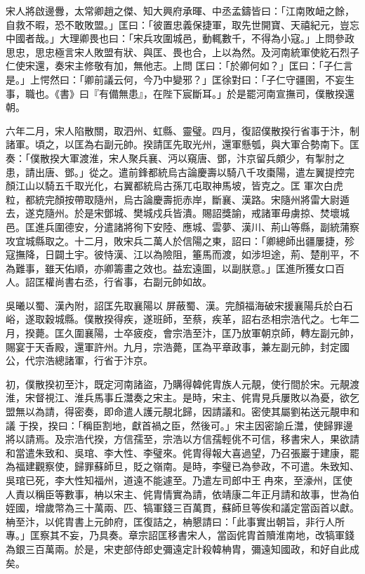 \begin{pinyinscope}
 宋人將啟邊釁，太常卿趙之傑、知大興府承暉、中丞孟鑄皆曰：「江南敗衄之餘，自救不暇，恐不敢敗盟。」匡曰：「彼置忠義保捷軍，取先世開寶、天禧紀元，豈忘中國者哉。」大理卿畏也曰：「宋兵攻圍城邑，動輒數千，不得為小寇。」上問參政思忠，思忠極言宋人敗盟有狀、與匡、畏也合，上以為然。及河南統軍使紇石烈子仁使宋還，奏宋主修敬有加，無他志。上問
 匡曰：「於卿何如？」匡曰：「子仁言是。」上愕然曰：「卿前議云何，今乃中變邪？」匡徐對曰：「子仁守疆圉，不妄生事，職也。《書》曰『有備無患』，在陛下宸斷耳。」於是罷河南宣撫司，僕散揆還朝。



 六年二月，宋人陷散關，取泗州、虹縣、靈璧。四月，復詔僕散揆行省事于汴，制諸軍。頃之，以匡為右副元帥。揆請匡先取光州，還軍懸瓠，與大軍合勢南下。匡奏：「僕散揆大軍渡淮，宋人聚兵襄、沔以窺唐、鄧，汴京留兵頗少，有掣肘之患，請出唐、鄧。」從之。遣前鋒都統烏古論慶壽以騎八千攻棗陽，遣左翼提控完顏江山以騎五千取光化，右翼都統烏古孫兀屯取神馬坡，皆克之。匡
 軍次白虎粒，都統完顏按帶取隨州，烏古論慶壽扼赤岸，斷襄、漢路。宋隨州將雷大尉遁去，遂克隨州。於是宋鄧城、樊城戍兵皆潰。賜詔獎諭，戒諸軍毋虜掠、焚壞城邑。匡進兵圍德安，分遣諸將徇下安陸、應城、雲夢、漢川、荊山等縣，副統蒲察攻宜城縣取之。十二月，敗宋兵二萬人於信陽之東，詔曰：「卿總師出疆屢捷，殄寇撫降，日闢土宇。彼恃漢、江以為險阻，箠馬而渡，如涉坦途，荊、楚削平，不為難事，雖天佑順，亦卿籌畫之效也。益宏遠圖，以副朕意。」匡進所獲女口百人。詔匡權尚書右丞，行省事，右副元帥如故。



 吳曦以蜀、漢內附，詔匡先取襄陽以
 屏蔽蜀、漢。完顏福海破宋援襄陽兵於白石峪，遂取穀城縣。僕散揆得疾，遂班師，至蔡，疾革，詔右丞相宗浩代之。七年二月，揆薨。匡久圍襄陽，士卒疲疫，會宗浩至汴，匡乃放軍朝京師，轉左副元帥，賜宴于天香殿，還軍許州。九月，宗浩薨，匡為平章政事，兼左副元帥，封定國公，代宗浩總諸軍，行省于汴京。



 初，僕散揆初至汴，既定河南諸盜，乃購得韓侂胄族人元靚，使行間於宋。元靚渡淮，宋督視江、淮兵馬事丘灊奏之宋主。是時，宋主、侂胄見兵屢敗以為憂，欲乞盟無以為請，得密奏，即命遣人護元靚北歸，因請議和。密使其屬劉祐送元靚申和議
 于揆，揆曰：「稱臣割地，獻首禍之臣，然後可。」宋主因密諭丘灊，使歸罪邊將以請焉。及宗浩代揆，方信孺至，宗浩以方信孺輕佻不可信，移書宋人，果欲請和當遣朱致和、吳琯、李大性、李璧來。侂胄得報大喜過望，乃召張巖于建康，罷為福建觀察使，歸罪蘇師旦，貶之嶺南。是時，李璧已為參政，不可遣。朱致知、吳琯已死，李大性知福州，道遠不能遽至。乃遣左司郎中王冉來，至濠州，匡使人責以稱臣等數事，柟以宋主、侂胄情實為請，依靖康二年正月請和故事，世為伯姪國，增歲幣為三十萬兩、匹、犒軍錢三百萬貫，蘇師旦等俟和議定當函首以獻。
 柟至汴，以侂胄書上元帥府，匡復詰之，柟懇請曰：「此事實出朝旨，非行人所專。」匡察其不妄，乃具奏。章宗詔匡移書宋人，當函侂胄首贖淮南地，改犒軍錢為銀三百萬兩。於是，宋吏部侍郎史彌遠定計殺韓柟胄，彌遠知國政，和好自此成矣。




\end{pinyinscope}

